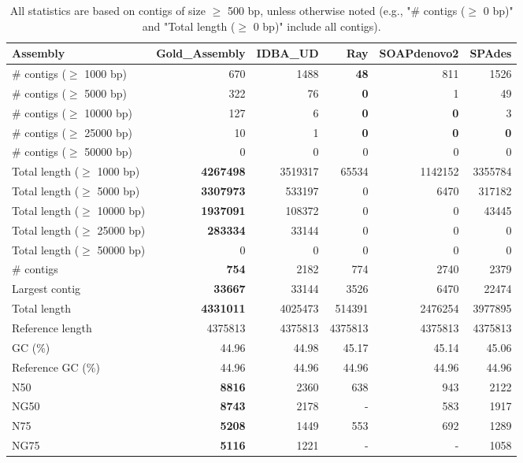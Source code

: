 \documentclass[12pt,a4paper]{article}
\begin{document}
\begin{table}[ht]
\begin{center}
\caption{All statistics are based on contigs of size $\geq$ 500 bp, unless otherwise noted (e.g., "\# contigs ($\geq$ 0 bp)" and "Total length ($\geq$ 0 bp)" include all contigs).}
\begin{tabular}{|l*{5}{|r}|}
\hline
Assembly & Gold\_Assembly & IDBA\_UD & Ray & SOAPdenovo2 & SPAdes \\ \hline
\# contigs ($\geq$ 1000 bp) & 670 & 1488 & {\bf 48} & 811 & 1526 \\ \hline
\# contigs ($\geq$ 5000 bp) & 322 & 76 & {\bf 0} & 1 & 49 \\ \hline
\# contigs ($\geq$ 10000 bp) & 127 & 6 & {\bf 0} & {\bf 0} & 3 \\ \hline
\# contigs ($\geq$ 25000 bp) & 10 & 1 & {\bf 0} & {\bf 0} & {\bf 0} \\ \hline
\# contigs ($\geq$ 50000 bp) & 0 & 0 & 0 & 0 & 0 \\ \hline
Total length ($\geq$ 1000 bp) & {\bf 4267498} & 3519317 & 65534 & 1142152 & 3355784 \\ \hline
Total length ($\geq$ 5000 bp) & {\bf 3307973} & 533197 & 0 & 6470 & 317182 \\ \hline
Total length ($\geq$ 10000 bp) & {\bf 1937091} & 108372 & 0 & 0 & 43445 \\ \hline
Total length ($\geq$ 25000 bp) & {\bf 283334} & 33144 & 0 & 0 & 0 \\ \hline
Total length ($\geq$ 50000 bp) & 0 & 0 & 0 & 0 & 0 \\ \hline
\# contigs & {\bf 754} & 2182 & 774 & 2740 & 2379 \\ \hline
Largest contig & {\bf 33667} & 33144 & 3526 & 6470 & 22474 \\ \hline
Total length & {\bf 4331011} & 4025473 & 514391 & 2476254 & 3977895 \\ \hline
Reference length & 4375813 & 4375813 & 4375813 & 4375813 & 4375813 \\ \hline
GC (\%) & 44.96 & 44.98 & 45.17 & 45.14 & 45.06 \\ \hline
Reference GC (\%) & 44.96 & 44.96 & 44.96 & 44.96 & 44.96 \\ \hline
N50 & {\bf 8816} & 2360 & 638 & 943 & 2122 \\ \hline
NG50 & {\bf 8743} & 2178 & - & 583 & 1917 \\ \hline
N75 & {\bf 5208} & 1449 & 553 & 692 & 1289 \\ \hline
NG75 & {\bf 5116} & 1221 & - & - & 1058 \\ \hline

\end{tabular}
\end{center}
\end{table}
\end{document}
